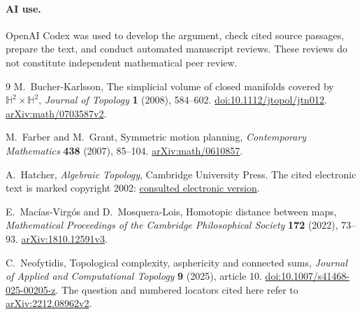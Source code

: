 \documentclass[11pt]{article}
\begin{document}
\paragraph{AI use.}
OpenAI Codex was used to develop the argument, check cited source passages,
prepare the text, and conduct automated manuscript reviews. These reviews
do not constitute independent mathematical peer review.

\begin{thebibliography}{9}
M.~Bucher-Karlsson,
The simplicial volume of closed manifolds covered by
$\mathbb H^2\times\mathbb H^2$,
\emph{Journal of Topology} \textbf{1} (2008), 584--602.
\href{https://doi.org/10.1112/jtopol/jtn012}{doi:10.1112/jtopol/jtn012}.
\href{https://arxiv.org/abs/math/0703587v2}{arXiv:math/0703587v2}.

M.~Farber and M.~Grant,
Symmetric motion planning,
\emph{Contemporary Mathematics} \textbf{438} (2007), 85--104.
\href{https://arxiv.org/abs/math/0610857}{arXiv:math/0610857}.

A.~Hatcher,
\emph{Algebraic Topology}, Cambridge University Press.
The cited electronic text is marked copyright 2002:
\href{https://webhomes.maths.ed.ac.uk/~v1ranick/papers/hatchat.pdf}{consulted electronic version}.

E.~Mac\'ias-Virg\'os and D.~Mosquera-Lois,
Homotopic distance between maps,
\emph{Mathematical Proceedings of the Cambridge Philosophical Society}
\textbf{172} (2022), 73--93.
\href{https://arxiv.org/abs/1810.12591v3}{arXiv:1810.12591v3}.

C.~Neofytidis,
Topological complexity, asphericity and connected sums,
\emph{Journal of Applied and Computational Topology} \textbf{9} (2025),
article 10.
\href{https://doi.org/10.1007/s41468-025-00205-z}{doi:10.1007/s41468-025-00205-z}.
The question and numbered locators cited here refer to
\href{https://arxiv.org/abs/2212.08962v2}{arXiv:2212.08962v2}.
\end{thebibliography}
\end{document}
